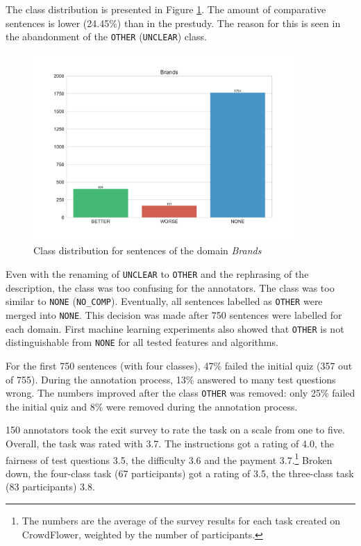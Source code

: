 The class distribution is presented in Figure \ref{fig:brands_fin}. The amount of comparative sentences is lower (24.45\%) than in the prestudy. The reason for this is seen in the abandonment of the \texttt{OTHER} (\texttt{UNCLEAR}) class. 

\begin{figure}[h]
\centering
\caption{Class distribution for sentences of the domain \emph{Brands}}
\label{fig:brands_fin}
\includegraphics[width=0.9\textwidth]{images/dataset/Brands-dist}
\end{figure}




Even with the renaming of \texttt{UNCLEAR} to \texttt{OTHER} and the rephrasing of the description, the class was too confusing for the annotators. The class was too similar to \texttt{NONE} (\texttt{NO\_COMP}). Eventually, all sentences labelled as \texttt{OTHER} were merged into \texttt{NONE}. This decision was made after 750 sentences were labelled for each domain. First machine learning experiments also showed that \texttt{OTHER} is not distinguishable from \texttt{NONE} for all tested features and algorithms.

For the first 750 sentences (with four classes), 47\% failed the initial quiz (357 out of 755). During the annotation process, 13\% answered to many test questions wrong. The numbers improved after the class \texttt{OTHER} was removed: only 25\% failed the initial quiz and 8\% were removed during the annotation process.

150 annotators took the exit survey to rate the task on a scale from one to five. Overall, the task was rated with 3.7. The instructions got a rating of 4.0, the fairness of test questions 3.5, the difficulty 3.6 and the payment 3.7.\footnote{The numbers are the average of the survey results for each task created on CrowdFlower, weighted by the number of participants.} Broken down, the four-class task (67 participants) got a rating of 3.5, the three-class task (83 participants) 3.8.


